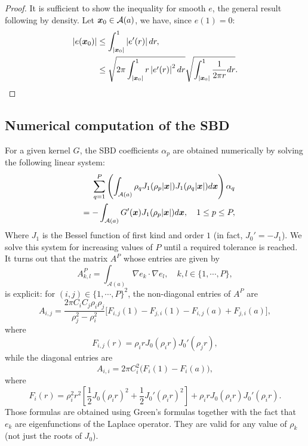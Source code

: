 \documentclass{article}
\begin{document}
\begin{proof}
	It is sufficient to show the inequality for smooth $e$, the general result following by density. Let $\boldsymbol{x}_0 \in \mathcal{A}(a)$, we have, since $e(1)=0$:
	\begin{align}
		\left\lvert e(\boldsymbol{x}_0) \right\rvert & \leq \int_{\left\lvert \boldsymbol{x}_0 \right\rvert}^1 \left\lvert e'(r) \right\rvert dr,                                                                     \\
		                  & \leq \sqrt{2\pi \int_{\left\lvert \boldsymbol{x}_0 \right\rvert}^1 r \left\lvert e'(r) \right\rvert^2 dr} \sqrt{\int_{\left\lvert \boldsymbol{x}_0 \right\rvert}^1 \frac{1}{2\pi r} dr}.
	\end{align}	
					
\end{proof}

																		
\subsection{Numerical computation of the SBD}
\label{sub:Chol}
																		
For a given kernel $G$, the SBD coefficients $\alpha_p$ are obtained numerically by solving the following linear system: 
\begin{equation}
\begin{split}
\sum_{q = 1}^P \left(\int_{\mathcal{A}(a)} \rho_ q J_1(\rho_p|\boldsymbol{x}|) J_1(\rho_q|\boldsymbol{x}|) d\boldsymbol{x}\right) \alpha_q \\
\quad = -\int_{\mathcal{A}(a)} G'(\boldsymbol{x}) J_1(\rho_p|\boldsymbol{x}|)d\boldsymbol{x}, \quad 1\leq p \leq P,
\end{split}	
\label{LinearSystem}
\end{equation}
Where $J_1$ is the Bessel function of first kind and order $1$ (in fact, $J_0' = - J_1$). We solve this system for increasing values of $P$ until a required tolerance is reached. It turns out that the matrix $A^P$ whose entries are given by
\[ A^P_{k,l} = \int_{\mathcal{A}(a)} \!\!\!\!\!\!\!\! \nabla e_k \cdot \nabla e_l,\quad k,l \in \{1,\cdots,P\},\]
is explicit: for $(i,j) \in \{1,\cdots,P\}^2$, the non-diagonal entries of $A^P$ are
\begin{equation*}
	A_{i,j} = \frac{2\pi C_i C_j \rho_i \rho_j}{\rho_j^2 - \rho_i^2}\bigg[F_{i,j}(1) - F_{j,i}(1) - F_{i,j}(a) + F_{j,i}(a)\bigg],
\end{equation*}
where 
\[	 F_{i,j}(r) =  \rho_i r J_0(\rho_i r)J_0'(\rho_j r),\]
while the diagonal entries are
\begin{equation*}
	A_{i,i} = 2\pi C_i^2 \big(F_i(1) - F_i(a)\big),
\end{equation*}
where 
\[F_i(r) = \rho_i^2r^2\left[\dfrac{1}{2}J_0(\rho_ir)^2 + \frac{1}{2}J_0'(\rho_ir)^2\right] + \rho_irJ_0(\rho_i r)J_0'(\rho_ir).\]
Those formulas are obtained using Green's formulas together with the fact that $e_k$ are eigenfunctions of the Laplace operator. They are valid for any value of $\rho_k$ (not just the roots of $J_0$).
																		
\end{document}
